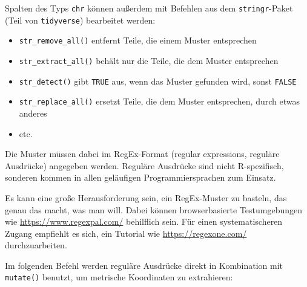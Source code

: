 \documentclass[
  ngerman,
]{article}
\providecommand{\tightlist}{%
  \setlength{\itemsep}{0pt}\setlength{\parskip}{0pt}}
\begin{document}
Spalten des Typs \texttt{chr} können außerdem mit Befehlen aus dem \texttt{stringr}-Paket (Teil von \texttt{tidyverse}) bearbeitet werden:

\begin{itemize}
\tightlist
\item
  \texttt{str\_remove\_all()} entfernt Teile, die einem Muster entsprechen
\item
  \texttt{str\_extract\_all()} behält nur die Teile, die dem Muster entsprechen
\item
  \texttt{str\_detect()} gibt \texttt{TRUE} aus, wenn das Muster gefunden wird, sonst \texttt{FALSE}
\item
  \texttt{str\_replace\_all()} ersetzt Teile, die dem Muster entsprechen, durch etwas anderes
\item
  etc.
\end{itemize}

Die Muster müssen dabei im RegEx-Format (regular expressions, reguläre Ausdrücke) angegeben werden. Reguläre Ausdrücke sind nicht R-spezifisch, sonderen kommen in allen geläufigen Programmiersprachen zum Einsatz.

Es kann eine große Herausforderung sein, ein RegEx-Muster zu basteln, das genau das macht, was man will. Dabei können browserbasierte Testumgebungen wie \url{https://www.regexpal.com/} behilflich sein. Für einen systematischeren Zugang empfiehlt es sich, ein Tutorial wie \url{https://regexone.com/} durchzuarbeiten.

Im folgenden Befehl werden reguläre Ausdrücke direkt in Kombination mit \texttt{mutate()} benutzt, um metrische Koordinaten zu extrahieren:
\end{document}
